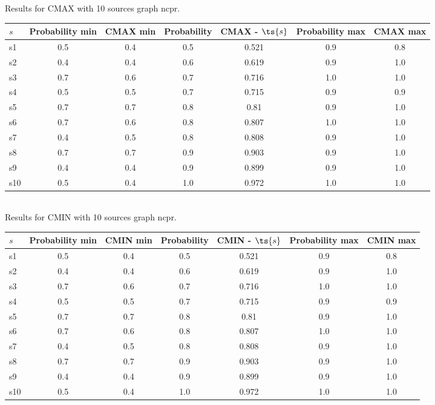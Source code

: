 \documentclass{article}
\begin{document}
\noindent Results for CMAX with 10 sources graph ncpr.

\noindent\begin{tabular}{|l|c|c|c|c|c|c|}
\hline
$s$& Probability min & CMAX min & Probability & CMAX - $\ts{s}$ & Probability max & CMAX max\\
\hline
s1 &0.5 & 0.4 & 0.5 & 0.521 & 0.9 & 0.8\\
\hline
s2 &0.4 & 0.4 & 0.6 & 0.619 & 0.9 & 1.0\\
\hline
s3 &0.7 & 0.6 & 0.7 & 0.716 & 1.0 & 1.0\\
\hline
s4 &0.5 & 0.5 & 0.7 & 0.715 & 0.9 & 0.9\\
\hline
s5 &0.7 & 0.7 & 0.8 & 0.81 & 0.9 & 1.0\\
\hline
s6 &0.7 & 0.6 & 0.8 & 0.807 & 1.0 & 1.0\\
\hline
s7 &0.4 & 0.5 & 0.8 & 0.808 & 0.9 & 1.0\\
\hline
s8 &0.7 & 0.7 & 0.9 & 0.903 & 0.9 & 1.0\\
\hline
s9 &0.4 & 0.4 & 0.9 & 0.899 & 0.9 & 1.0\\
\hline
s10 &0.5 & 0.4 & 1.0 & 0.972 & 1.0 & 1.0\\
\hline
\end{tabular}\\

\noindent Results for CMIN with 10 sources graph ncpr.

\noindent\begin{tabular}{|l|c|c|c|c|c|c|}
\hline
$s$& Probability min & CMIN min & Probability & CMIN - $\ts{s}$ & Probability max & CMIN max\\
\hline
s1 &0.5 & 0.4 & 0.5 & 0.521 & 0.9 & 0.8\\
\hline
s2 &0.4 & 0.4 & 0.6 & 0.619 & 0.9 & 1.0\\
\hline
s3 &0.7 & 0.6 & 0.7 & 0.716 & 1.0 & 1.0\\
\hline
s4 &0.5 & 0.5 & 0.7 & 0.715 & 0.9 & 0.9\\
\hline
s5 &0.7 & 0.7 & 0.8 & 0.81 & 0.9 & 1.0\\
\hline
s6 &0.7 & 0.6 & 0.8 & 0.807 & 1.0 & 1.0\\
\hline
s7 &0.4 & 0.5 & 0.8 & 0.808 & 0.9 & 1.0\\
\hline
s8 &0.7 & 0.7 & 0.9 & 0.903 & 0.9 & 1.0\\
\hline
s9 &0.4 & 0.4 & 0.9 & 0.899 & 0.9 & 1.0\\
\hline
s10 &0.5 & 0.4 & 1.0 & 0.972 & 1.0 & 1.0\\
\hline
\end{tabular}\\
\end{document}
